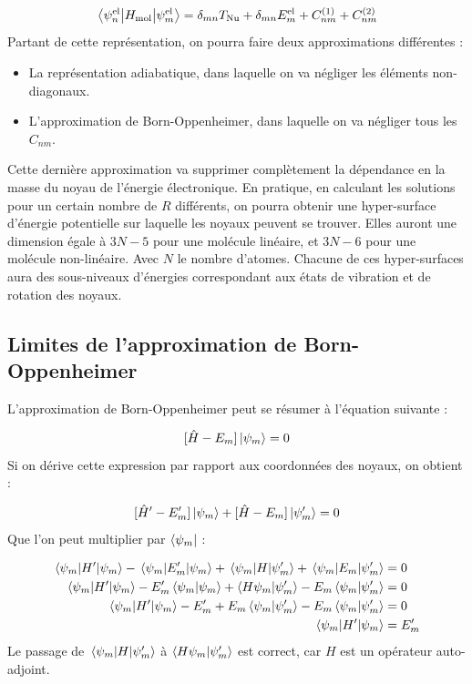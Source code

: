 \[
    \mel{\psi^\text{el}_n}{H_\text{mol}}{\psi^\text{el}_m} = \delta_{mn}T_\text{Nu} + \delta_{mn}E_m^\text{el} + C_{nm}^{(1)} + C_{nm}^{(2)}
\]
Partant de cette représentation, on pourra faire deux approximations différentes :
\begin{itemize}
    \item La représentation adiabatique, dans laquelle on va négliger les éléments non-diagonaux.
    \item L'approximation de Born-Oppenheimer, dans laquelle on va négliger tous les $C_{nm}$.
\end{itemize}
Cette dernière approximation va supprimer complètement la dépendance en la masse du noyau de l'énergie électronique. En pratique, en calculant les solutions pour un certain nombre de $R$ différents, on pourra obtenir une hyper-surface d'énergie potentielle sur laquelle les noyaux peuvent se trouver. Elles auront une dimension égale à $3N - 5$ pour une molécule linéaire, et $3N - 6$ pour une molécule non-linéaire. Avec $N$ le nombre d'atomes. Chacune de ces hyper-surfaces aura des sous-niveaux d'énergies correspondant aux états de vibration et de rotation des noyaux.


\subsection{Limites de l'approximation de Born-Oppenheimer}

L'approximation de Born-Oppenheimer peut se résumer à l'équation suivante :

\[ [\hat{H}-E_m]\ket{\psi_m} = 0 \]
Si on dérive cette expression par rapport aux coordonnées des noyaux, on obtient :

\begin{equation}\label{eq:3}
    [\hat{H}'-E_m']\ket{\psi_m} + [\hat{H}-E_m]\ket{\psi_m'} = 0
\end{equation}
Que l'on peut multiplier par $\bra{\psi_m}$ :

\begin{align*}
    \mel{\psi_m}{H'}{\psi_m} - \mel{\psi_m}{E_m'}{\psi_m} + \mel{\psi_m}{H}{\psi_m'} + \mel{\psi_m}{E_m}{\psi_m'} & = 0 \\
    \mel{\psi_m}{H'}{\psi_m} - E_m'\braket{\psi_m}{\psi_m} + \braket{H\psi_m}{\psi_m'} - E_m \braket{\psi_m}{\psi_m'} & = 0 \\
    \mel{\psi_m}{H'}{\psi_m} - E_m' + E_m\braket{\psi_m}{\psi_m'} - E_m \braket{\psi_m}{\psi_m'} & = 0 \\
    \mel{\psi_m}{H'}{\psi_m} & = E_m'
\end{align*}
Le passage de $\mel{\psi_m}{H}{\psi_m'}$ à $\braket{H\psi_m}{\psi_m'}$ est correct, car $H$ est un opérateur auto-adjoint.

